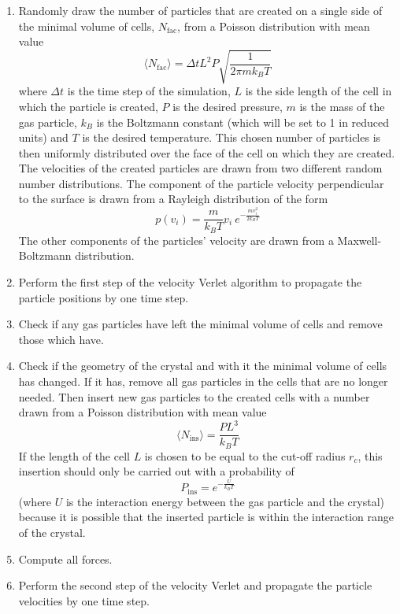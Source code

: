 \documentclass[12pt]{article}
\begin{document}
\begin{enumerate}
    \item Randomly draw the number of particles that are created on a single side of the minimal volume of cells, $N_\text{fac}$, from a Poisson
        distribution with mean value
        \begin{equation}
            \label{eq:numberofparticles}
            \langle N_\text{fac}\rangle = \Delta t L^2 P \sqrt{\frac{1}{2\pi m k_B T}}
        \end{equation}
        where $\Delta t$ is the time step of the simulation, $L$ is the side length of the cell in which the particle is created, $P$ is the desired
        pressure, $m$ is the mass of the gas particle, $k_B$ is the Boltzmann constant (which will be set to 1 in reduced units) and $T$ is the
        desired temperature. This chosen number of particles is then uniformly distributed over the face of the cell on which they are created. The
        velocities of the created particles are drawn from two different random number distributions. The component of the particle velocity perpendicular to
        the surface is drawn from a Rayleigh distribution of the form 
        \begin{equation}
            p(v_i) = \frac{m}{k_B T}v_i \ e^{-\frac{mv_i^2}{2k_BT}}
        \end{equation}
        The other components of the particles' velocity are drawn from a Maxwell-Boltzmann distribution.
    \item Perform the first step of the velocity Verlet algorithm to propagate the particle positions by one time step.
    \item Check if any gas particles have left the minimal volume of cells and remove those which have.
    \item Check if the geometry of the crystal and with it the minimal volume of cells has changed. If it has, remove all gas particles in the cells
        that are no longer needed. Then insert new gas particles to the created cells with a number drawn from a Poisson distribution with mean value
        \begin{equation}
            \langle N_\text{ins}\rangle = \frac{PL^3}{k_BT}
        \end{equation}
        If the length of the cell $L$ is chosen to be equal to the cut-off radius $r_c$, this insertion should only be carried out with a probability of
        \begin{equation}
            P_\text{ins} = e^{-\frac{U}{k_BT}}
        \end{equation}
        (where $U$ is the interaction energy between the gas particle and the crystal) because it is possible that the inserted particle is 
        within the interaction range of the crystal. 
    \item Compute all forces.
    \item Perform the second step of the velocity Verlet and propagate the particle velocities by one time step. 
\end{enumerate}
\end{document}
